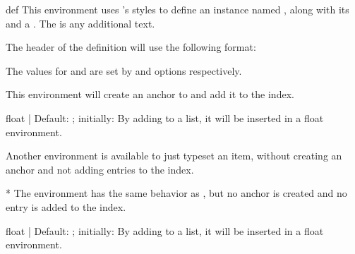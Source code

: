 \documentclass[11pt]{article}
\begin{document}
\begin{Environmentenv*}{def}{}{}
    \label{environmentdef}
    This environment uses 's styles to define an instance named , along with its  and a . The  is any additional text.

    The header of the definition will use the following format:


    The values for  and  are set by  and  options respectively.

    This environment will create an anchor to  and add it to the index.
\end{Environmentenv*}


\begin{PDExample}
    \begin{EnumItemOptiondef}{float}{ | }{Default: ; initially: }
        By adding  to a list, it will be inserted in a float environment.
    \end{EnumItemOptiondef}
\end{PDExample}

Another environment is available to just typeset an item, without creating an anchor and not adding entries to the index.

\begin{Environmentenv*}{*}{}{}
    The  environment has the same behavior as , but no anchor is created and no entry is added to the index.
\end{Environmentenv*}

\begin{PDExample}
    \begin{EnumItemOption*}{float}{ | }{Default: ; initially: }
        By adding  to a list, it will be inserted in a float environment.
    \end{EnumItemOption*}
\end{PDExample}
\end{document}
